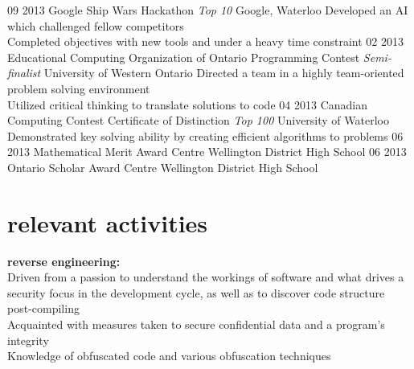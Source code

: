 \documentclass[]{friggeri-cv-short}
\begin{document}
\begin{entrylist}
  \entry
  	{09 2013}
  	{Google Ship Wars Hackathon \textsf{\em{Top 10}}}
  	{Google, Waterloo}
  	{Developed an AI which challenged fellow competitors \\
  	 Completed objectives with new tools and under a heavy time constraint}
  \entry
  	{02 2013}
  	{Educational Computing Organization of Ontario Programming Contest \textsf{\em{Semi-finalist}}}
  	{University of Western Ontario}
  	{Directed a team in a highly team-oriented problem solving environment \\
  	 Utilized critical thinking to translate solutions to code}
  \entry
	{04 2013}  	
  	{Canadian Computing Contest Certificate of Distinction \textsf{\em{Top 100}}}
  	{University of Waterloo}
  	{Demonstrated key solving ability by creating efficient algorithms to problems}
  \entry
  	{06 2013}
  	{Mathematical Merit Award}
  	{Centre Wellington District High School}
  	{}
  \entry
  	{06 2013}
  	{Ontario Scholar Award}
  	{Centre Wellington District High School}
  	{}

\end{entrylist}

\section{relevant activities}
{\bf reverse engineering: }\\
Driven from a passion to understand the workings of software and what drives a security focus \hspace*{5mm} in the development cycle, as well as to discover code structure post-compiling \\
Acquainted with measures taken to secure confidential data and a program's integrity \\
Knowledge of obfuscated code and various obfuscation techniques \\
\end{document}
